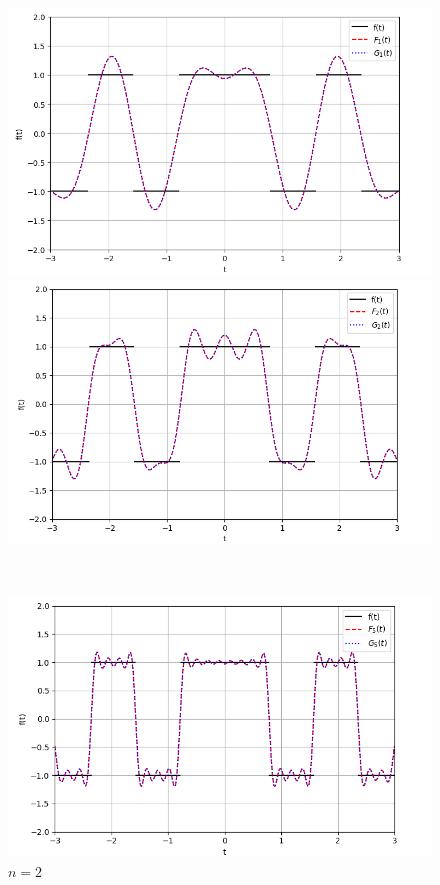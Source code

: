 \documentclass[a4paper]{article}
\begin{document}
\begin{figure}[H]
    \begin{minipage}{0.5\textwidth}
        \centering \includegraphics[width=\textwidth]{even_func/1.png}
        \caption{$n = 1$}
    \end{minipage}\hfill
    \begin{minipage}{0.5\textwidth}
        \centering \includegraphics[width=\textwidth]{even_func/2.png}
        \caption{$n = 2$}
    \end{minipage}\\[2em]
    \begin{minipage}{0.5\textwidth}
        \centering \includegraphics[width=\textwidth]{even_func/5.png}

\end{minipage}
\end{figure}
\end{document}
